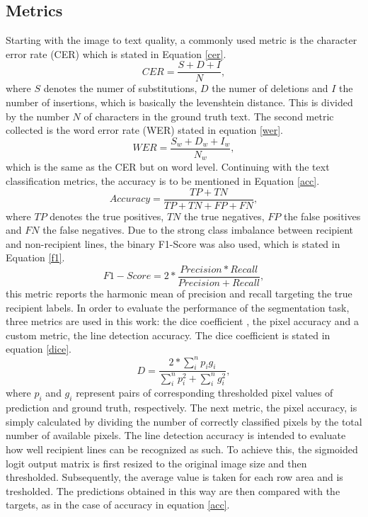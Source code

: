 \documentclass[conference]{IEEEtran}
\begin{document}
\subsection{Metrics}
Starting with the image to text quality, a commonly used metric is the character error rate (CER) which is stated in Equation \ref{cer}.
\begin{equation}\label{cer}
CER=\frac{S+D+I}{N},
\end{equation}
where $S$ denotes the numer of substitutions, $D$ the numer of deletions and $I$ the number of insertions, which is basically the levenshtein distance. This is divided by the number $N$ of characters in the ground truth text. The second metric collected is the word error rate (WER) stated in equation \ref{wer}.
\begin{equation}\label{wer}
WER=\frac{S_w+D_w+I_w}{N_w},
\end{equation}
which is the same as the CER but on word level. Continuing with the text classification metrics, the accuracy is to be mentioned in Equation \ref{acc}.
\begin{equation}\label{acc}
Accuracy=\frac{TP+TN}{TP+TN+FP+FN},
\end{equation}
where $TP$ denotes the true positives, $TN$ the true negatives, $FP$ the false positives and $FN$ the false negatives. Due to the strong class imbalance between recipient and non-recipient lines, the binary F1-Score was also used, which is stated in Equation \ref{f1}.
\begin{equation}\label{f1}
F1-Score=2*\frac{Precision*Recall}{Precision+Recall},
\end{equation}
this metric reports the harmonic mean of precision and recall targeting the true recipient labels. In order to evaluate the performance of the segmentation task, three metrics are used in this work: the dice coefficient \cite{milletari2016vnet}, the pixel accuracy and a custom metric, the line detection accuracy. The dice coefficient is stated in equation \ref{dice}.
\begin{equation}\label{dice}
D=\frac{2*\sum_{i}^n p_i g_i}{\sum_{i}^n p_i^2 + \sum_{i}^n g_i^2},
\end{equation}
where $p_i$ and $g_i$ represent pairs of corresponding thresholded pixel values of prediction and ground truth, respectively. The next metric, the pixel accuracy, is simply calculated by dividing the number of correctly classified pixels by the total number of available pixels. The line detection accuracy is intended to evaluate how well recipient lines can be recognized as such. To achieve this, the sigmoided logit output matrix is first resized to the original image size and then thresholded. Subsequently, the average value is taken for each row area and is tresholded. The predictions obtained in this way are then compared with the targets, as in the case of accuracy in equation \ref{acc}.
\end{document}
